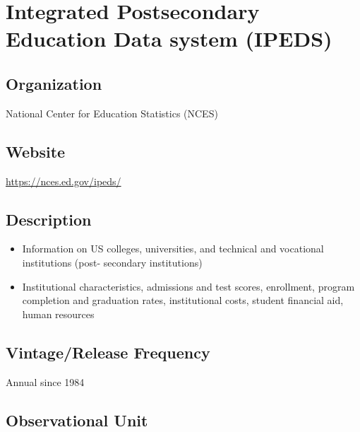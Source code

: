 \documentclass[
]{book}
\providecommand{\tightlist}{%
  \setlength{\itemsep}{0pt}\setlength{\parskip}{0pt}}
\begin{document}
\hypertarget{integrated-postsecondary-education-data-system-ipeds}{%
\chapter{Integrated Postsecondary Education Data system (IPEDS)}\label{integrated-postsecondary-education-data-system-ipeds}}

\hypertarget{organization-34}{%
\section{Organization}\label{organization-34}}

National Center for Education Statistics (NCES)

\hypertarget{website-34}{%
\section{Website}\label{website-34}}

\url{https://nces.ed.gov/ipeds/}

\hypertarget{description-34}{%
\section{Description}\label{description-34}}

\begin{itemize}
\tightlist
\item
  Information on US colleges, universities, and technical and vocational institutions (post- secondary institutions)
\item
  Institutional characteristics, admissions and test scores, enrollment, program completion and graduation rates, institutional costs, student financial aid, human resources
\end{itemize}

\hypertarget{vintagerelease-frequency-34}{%
\section{Vintage/Release Frequency}\label{vintagerelease-frequency-34}}

Annual since 1984

\hypertarget{observational-unit-34}{%
\section{Observational Unit}\label{observational-unit-34}}
\end{document}
